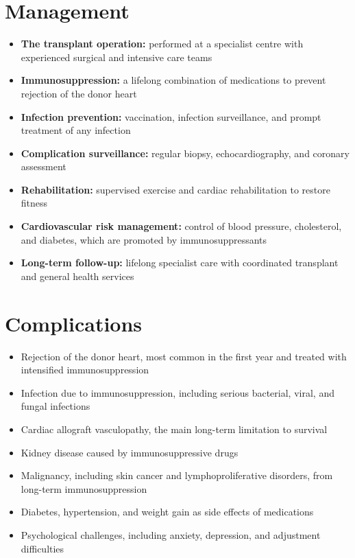 \section*{Management}
\begin{itemize}
    \item \textbf{The transplant operation:} performed at a specialist centre with experienced surgical and intensive care teams
    \item \textbf{Immunosuppression:} a lifelong combination of medications to prevent rejection of the donor heart
    \item \textbf{Infection prevention:} vaccination, infection surveillance, and prompt treatment of any infection
    \item \textbf{Complication surveillance:} regular biopsy, echocardiography, and coronary assessment
    \item \textbf{Rehabilitation:} supervised exercise and cardiac rehabilitation to restore fitness
    \item \textbf{Cardiovascular risk management:} control of blood pressure, cholesterol, and diabetes, which are promoted by immunosuppressants
    \item \textbf{Long-term follow-up:} lifelong specialist care with coordinated transplant and general health services
\end{itemize}

\section*{Complications}
\begin{itemize}
    \item Rejection of the donor heart, most common in the first year and treated with intensified immunosuppression
    \item Infection due to immunosuppression, including serious bacterial, viral, and fungal infections
    \item Cardiac allograft vasculopathy, the main long-term limitation to survival
    \item Kidney disease caused by immunosuppressive drugs
    \item Malignancy, including skin cancer and lymphoproliferative disorders, from long-term immunosuppression
    \item Diabetes, hypertension, and weight gain as side effects of medications
    \item Psychological challenges, including anxiety, depression, and adjustment difficulties
\end{itemize}

